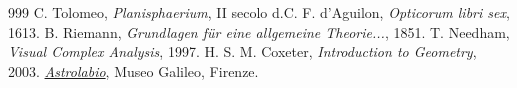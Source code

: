 \documentclass[11pt]{article}
\begin{document}
\clearpage

\begin{thebibliography}{999}
 C. Tolomeo, \textit{Planisphaerium}, II secolo d.C.
 F. d'Aguilon, \textit{Opticorum libri sex}, 1613.
 B. Riemann, \textit{Grundlagen für eine allgemeine Theorie...}, 1851.
 T. Needham, \textit{Visual Complex Analysis}, 1997.
 H. S. M. Coxeter, \textit{Introduction to Geometry}, 2003.
 \href{https://catalogo.museogalileo.it/approfondimento/Astrolabio.html}{\textit{Astrolabio}}, Museo Galileo, Firenze.
\end{thebibliography}
\end{document}
